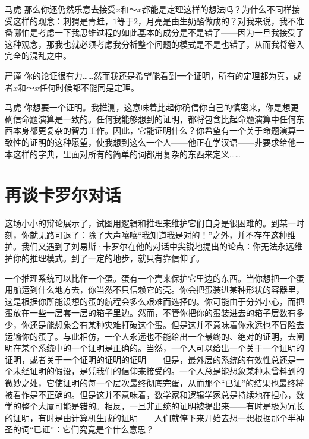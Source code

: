 \begin{dialogue}[labelwidth=2\ccwd, leftmargin=3\ccwd, topsep=\medskipamount]
\item[马虎]那么你还仍然乐意去接受$x$和$～x$都能是定理这样的想法吗？为什么不同样接受这样的观念：刺猬是青蛙，$1$等于$2$，月亮是由生奶酪做成的？对我来说，我不准备哪怕是考虑一下我思维过程的如此基本的成分是不是错了——因为一旦我接受了这种观念，那我也就必须考虑我分析整个问题的模式是不是也错了，从而我将卷入完全的混乱之中。

\item[严谨]你的论证很有力……然而我还是希望能看到一个证明，所有的定理都为真，或者$x$和$～x$任何时候都不能同是定理。

\item[马虎]你想要一个证明。我推测，这意味着比起你确信你自己的慎密来，你是想更确信命题演算是一致的。任何我能够想到的证明，都将包含比起命题演算中任何东西本身都更复杂的智力工作。因此，它能证明什么？你希望有一个关于命题演算一致性的证明的这种愿望，使我想到这么一个人——他正在学汉语——非要求给他一本这样的字典，里面对所有的简单的词都用复杂的东西来定义……
\end{dialogue}

\section{再谈卡罗尔对话}

这场小小的辩论展示了，试图用逻辑和推理来维护它们自身是很困难的。到某一时刻，你就无路可退了：除了大声嚷嚷“我知道我是对的！”之外，并不存在这种维护。我们又遇到了刘易斯·卡罗尔在他的对话中尖锐地提出的论点：你无法永远维护你的推理模式。到了一定的地步，就只有靠信仰了。

一个推理系统可以比作一个蛋。蛋有一个壳来保护它里边的东西。当你想把一个蛋用船运到什么地方去，你当然不只信赖它的壳。你会把蛋装进某种形状的容器里，这是根据你所能设想的蛋的航程会多么艰难而选择的。你可能由于分外小心，而把蛋放在一些一层套一层的箱子里边。然而，不管你把你的蛋装进去的箱子层数有多少，你还是能想象会有某种灾难打破这个蛋。但是这并不意味着你永远也不冒险去运输你的蛋了。与此相仿，一个人永远也不能给出一个最终的、绝对的证明，去阐明在某个系统中的一个证明是正确的。当然，一个人可以给出一个关于一个证明的证明，或者关于一个证明的证明的证明——但是，最外层的系统的有效性总还是一个未经证明的假设，是凭我们的信仰来接受的。一个人总是能想象某种未曾料到的微妙之处，它使证明的每一个层次最终彻底完蛋，从而那个“已证”的结果也最终将被看作是不正确的。但是这并不意味着，数学家和逻辑学家总是持续地在担心，数学的整个大厦可能是错的。相反，一旦非正统的证明被提出来——有时是极为冗长的证明，有时是由计算机生成的证明——人们就停下来开始去想一想根据那个半神圣的词“已证”：它们究竟是个什么意思？

